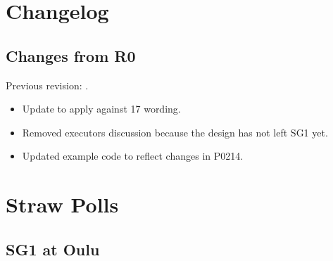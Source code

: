 \section{Changelog}
\subsection{Changes from R0}
Previous revision: \parencite{P0350R0}.
\begin{itemize}
  \item Update to apply against \CC{}17 wording.
  \item Removed executors discussion because the design has not left SG1 yet.
  \item Updated example code to reflect changes in P0214.
\end{itemize}

\section{Straw Polls}
\subsection{SG1 at Oulu}





